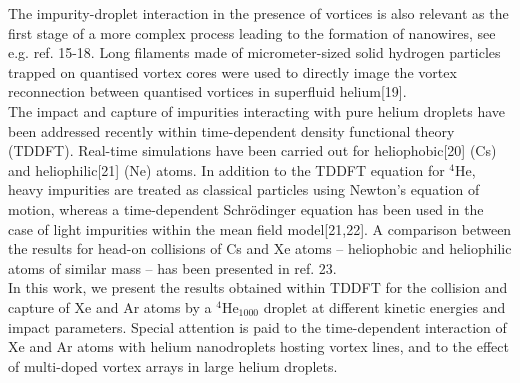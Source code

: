 		The impurity-droplet interaction in the presence of vortices is also relevant as the first stage of a more complex process leading to the formation of nanowires, see e.g. ref. 15-18. Long filaments made of micrometer-sized solid hydrogen particles trapped on quantised vortex cores were used to directly image the vortex reconnection between quantised vortices in superfluid helium[19].\\

		The impact and capture of impurities interacting with pure helium droplets have been addressed recently within time-dependent density functional theory (TDDFT). Real-time simulations have been carried out for heliophobic[20] (Cs) and heliophilic[21] (Ne) atoms. In addition to the TDDFT equation for $^4$He, heavy impurities are treated as classical particles using Newton's equation of motion, whereas a time-dependent Schr\"{o}dinger equation has been used in the case of light impurities within the mean field model[21,22]. A comparison between the results for head-on collisions of Cs and Xe atoms -- heliophobic and heliophilic atoms of similar mass -- has been presented in ref. 23.\\

		In this work, we present the results obtained within TDDFT for the collision and capture of Xe and Ar atoms by a $^4$He$_{1000}$ droplet at different kinetic energies and impact parameters. Special attention is paid to the time-dependent interaction of Xe and Ar atoms with helium nanodroplets hosting vortex lines, and to the effect of multi-doped vortex arrays in large helium droplets.\\

